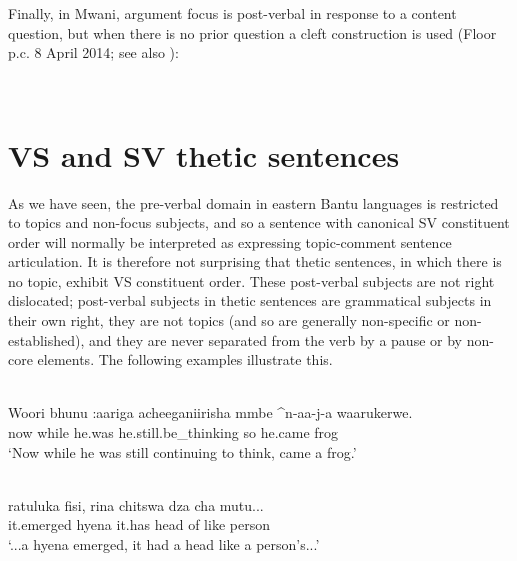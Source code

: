 \documentclass[output=paper]{langsci/langscibook}
\begin{document}
Finally, in Mwani, argument focus is post-verbal in response to a content question, but when there is no prior question a cleft construction is used (Floor p.c. 8 April 2014; see also \citealt[9]{floor2005}):

\ea\label{ex:23.nicolle}
\\
\z

\z
\z

\section{VS and SV thetic sentences}\label{§5:vs.nicolle}

As we have seen, the pre-verbal domain in eastern Bantu languages is restricted to topics and non-focus subjects, and so a sentence with canonical SV constituent order will normally be interpreted as expressing topic-comment sentence articulation. It is therefore not surprising that thetic sentences, in which there is no topic, exhibit VS constituent order. These post-verbal subjects are not right dislocated; post-verbal subjects in thetic sentences are grammatical subjects in their own right, they are not topics (and so are generally non-specific or non-established), and they are never separated from the verb by a pause or by non-core elements. The following examples illustrate this.


\ea\label{ex:24.nicolle}
\\
\gll Woori bhunu :aariga acheeganiirisha mmbe \^{}n-aa-j-a waarukerwe.\\
now while he.was he.still.be\_thinking so he.came frog\\
\glt ‘Now while he was still continuing to think, came a frog.’
\z

\ea\label{ex:25.nicolle}
\\
\gll ratuluka fisi, rina chitswa dza cha mutu...\\
it.emerged hyena it.has head of like person \\
\glt ‘...a hyena emerged, it had a head like a person’s...’
\z
\end{document}
